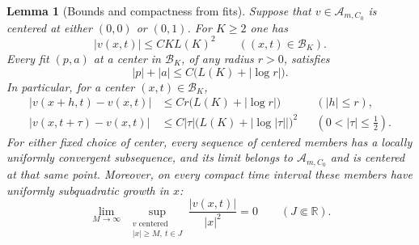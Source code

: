 \documentclass[11pt]{article}
\numberwithin{equation}{section}
\newtheorem{lemma}[theorem]{Lemma}
\theoremstyle{definition}
\theoremstyle{remark}
\newcommand{\R}{\mathbb{R}}
\newcommand{\Aclass}{\mathcal{A}}
\begin{document}
\begin{lemma}[Bounds and compactness from fits]\label{lem:fit-compactness}
Suppose that $v\in\Aclass_{m,C_0}$ is centered at either $(0,0)$ or
$(0,1)$. For $K\ge2$ one has
\begin{equation}\label{eq:centered-growth}
  |v(x,t)|\le C K L(K)^2\qquad ((x,t)\in\mathcal B_K).
\end{equation}
Every fit $(p,a)$ at a center in $\mathcal B_K$, of any radius $r>0$,
satisfies
\begin{equation}\label{eq:fit-parameter-bound}
  |p|+|a|\le C\bigl(L(K)+|\log r|\bigr).
\end{equation}
In particular, for a center $(x,t)\in\mathcal B_K$,
\begin{align}
  |v(x+h,t)-v(x,t)|
    &\le Cr\bigl(L(K)+|\log r|\bigr)
       &&(|h|\le r),\label{eq:spatial-fit-modulus}\\
  |v(x,t+\tau)-v(x,t)|
    &\le C|\tau|\bigl(L(K)+|\log|\tau||\bigr)^2
       &&(0<|\tau|\le\tfrac12).\label{eq:time-fit-modulus}
\end{align}
For either fixed choice of center, every sequence of centered
members has a locally uniformly convergent subsequence, and its
limit belongs to $\Aclass_{m,C_0}$ and is centered at that same
point. Moreover, on every compact time interval these members have
uniformly subquadratic growth in $x$:
\begin{equation}\label{eq:uniform-subquadratic-growth}
  \lim_{M\to\infty}\ 
  \sup_{\substack{v\text{ centered}\\ |x|\ge M,\ t\in J}}
       \frac{|v(x,t)|}{|x|^2}=0
  \qquad(J\Subset\R).
\end{equation}
\end{lemma}
\end{document}
